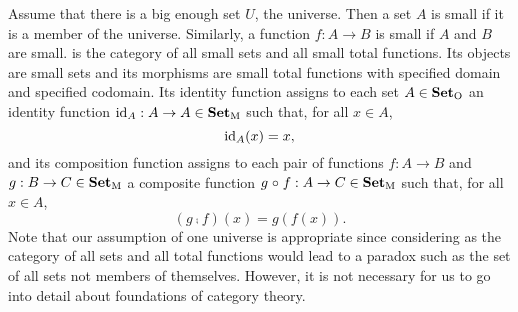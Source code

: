 \begin{example}



  \label{ex:set}

  \index{\set}


  Assume that there is a big enough set $U$, the universe. Then a set
  $A$ is small if it is a member of the universe. Similarly, a
  function $f: A \to B$ is small if $A$ and $B$ are small. \set is the
  category of all small sets and all small total functions. Its
  objects are small sets and its morphisms are small total functions
  with specified domain and specified codomain. Its identity function
  assigns to each set $A \in \mathcal{\mathbf{Set}}_{\operatorname{O}}$ an identity function
  $\operatorname{id}_{A}: A \to A \in \mathcal{\mathbf{Set}}_{\operatorname{M}}$ such that, for all $x \in A$,
  \begin{equation}
    \label{eq:set-identity}
    \operatorname{id}_{A}(x) = x
    \text{,}
  \end{equation}
  and its composition function assigns to each pair of functions $f: A
  \to B$ and $g: B \to C \in \mathcal{\mathbf{Set}}_{\operatorname{M}}$ a composite function $g
  \mathrel{\circ} f: A \to C \in \mathcal{\mathbf{Set}}_{\operatorname{M}}$ such that, for all $x \in A$,
  \begin{equation}
    \label{eq:set-composition}
    (g \comp f)(x) = g(f(x))
    \text{.}
  \end{equation}
  Note that our assumption of one universe is appropriate since
  considering \set as the category of all sets and all total functions
  would lead to a paradox such as the set of all sets not members of
  themselves. However, it is not necessary for us to go into detail
  about foundations of category theory.

\end{example}

